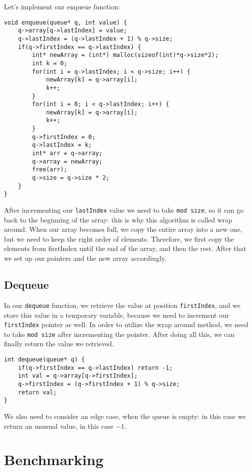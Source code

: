 \documentclass[a4paper,11pt]{article}
\begin{document}
    Let's implement our enqueue function:

    \begin{verbatim}
void enqueue(queue* q, int value) {
    q->array[q->lastIndex] = value;
    q->lastIndex = (q->lastIndex + 1) % q->size;
    if(q->firstIndex == q->lastIndex) {
        int* newArray = (int*) malloc(sizeof(int)*q->size*2);
        int k = 0;
        for(int i = q->lastIndex; i < q->size; i++) {
            newArray[k] = q->array[i];
            k++;
        }
        for(int i = 0; i < q->lastIndex; i++) {
            newArray[k] = q->array[i];
            k++;
        }
        q->firstIndex = 0;
        q->lastIndex = k;
        int* arr = q->array;
        q->array = newArray;
        free(arr);
        q->size = q->size * 2;
    }
}
    \end{verbatim}

    After incrementing our {\tt lastIndex} value we need to take {\tt mod size}, so it can go back to the beginning of the array: this is why this algorithm is called wrap around.
    When our array becomes full, we copy the entire array into a new one, but we need to keep the right order of elements.
    Therefore, we first copy the elements from firstIndex until the end of the array, and then the rest.
    After that we set up our pointers and the new array accordingly.

    \subsection*{Dequeue}

    In our {\tt dequeue} function, we retrieve the value at position {\tt firstIndex}, and we store this value in a temporary variable, because we need to increment our {\tt firstIndex} pointer as well.
    In order to utilize the wrap around method, we need to take {\tt mod size} after incrementing the pointer.
    After doing all this, we can finally return the value we retrieved.

    \begin{verbatim}
int dequeue(queue* q) {
    if(q->firstIndex == q->lastIndex) return -1;
    int val = q->array[q->firstIndex];
    q->firstIndex = (q->firstIndex + 1) % q->size;
    return val;
}
    \end{verbatim}

    We also need to consider an edge case, when the queue is empty: in this case we return an unusual value, in this case $-1$.

    \section*{Benchmarking}
\end{document}
